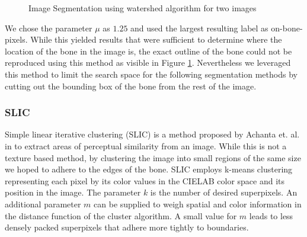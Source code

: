 \documentclass[pdftex,12pt,a4paper]{report}
\begin{document}
\begin{figure}[h]
\begin{subfigure}[b]{0.24\textwidth}
		\subcaption{}
	\end{subfigure}
	\caption{Image Segmentation using watershed algorithm for two images}
	\label{fig:watershed}
\end{figure}

We chose the parameter $\mu$ as $1.25$ and used the largest resulting label as on-bone-pixels. While this yielded results that were sufficient to determine where the  location of the bone in the image is, the exact outline of the bone could not be reproduced using this method as visible in Figure \ref{fig:watershed}. Nevertheless we leveraged this method to limit the search space for the following segmentation methods by cutting out the bounding box of the bone from the rest of the image.

\subsubsection{SLIC}

Simple linear iterative clustering (SLIC) is a method proposed by Achanta et. al. in \cite{achanta2012slic} to extract areas of perceptual similarity from an image. While this is not a texture based method, by clustering the image into small regions of the same size we hoped to adhere to the edges of the bone. SLIC employs k-means clustering representing each pixel by its color values in the CIELAB color space and its position in the image. The parameter $k$ is the number of desired superpixels. An additional parameter $m$ can be supplied to weigh spatial and color information in the distance function of the cluster algorithm. A small value for $m$ leads to less densely packed superpixels that adhere more tightly to boundaries.
\end{document}
